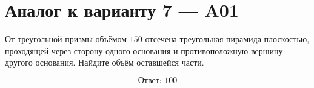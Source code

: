 \documentclass[12pt,a4paper]{article}
\begin{document}
\section*{Аналог к варианту 7 — A01}

От треугольной призмы объёмом \(150\) отсечена треугольная пирамида плоскостью, проходящей через сторону одного основания и противоположную вершину другого основания. Найдите объём оставшейся части.

\begin{center}
\end{center}

\[
\boxed{\text{Ответ: }100}
\]
\end{document}
